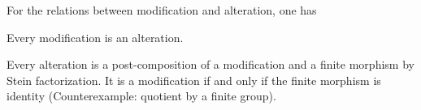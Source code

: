 \documentclass[a4paper, twoside]{article}
\begin{document}
\begin{rmk}
	For the relations between modification and alteration, one has
	\begin{itm}
		\item Every modification is an alteration.
		\item Every alteration is a post-composition of a modification and a finite morphism by Stein factorization. It is a modification if and only if the finite morphism is identity (Counterexample: quotient by a finite group).
	\end{itm}
\end{rmk}








\end{document}
